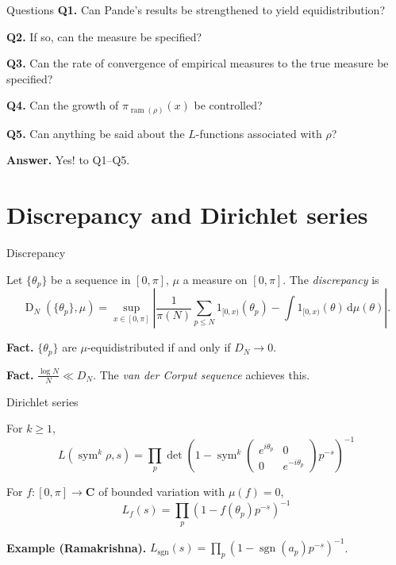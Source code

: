 \documentclass{beamer}
\DeclareMathOperator{\D}{D}
\DeclareMathOperator{\ram}{ram}
\DeclareMathOperator{\sgn}{sgn}
\DeclareMathOperator{\sym}{sym}
\newcommand{\bC}{\mathbf{C}}
\newcommand{\dd}{\mathrm{d}}
\begin{document}
\begin{frame}{Questions}
\textbf{Q1.} Can Pande's results be strengthened to yield equidistribution? 
\pause

\textbf{Q2.} If so, can the measure be specified?
\pause

\textbf{Q3.} Can the rate of convergence of empirical measures to the true measure 
be specified?
\pause

\textbf{Q4.} Can the growth of $\pi_{\ram(\rho)}(x)$ be controlled?
\pause

\textbf{Q5.} Can anything be said about the $L$-functions associated with $\rho$?
\pause

\textbf{Answer.} Yes! to Q1--Q5. 
\end{frame}





\section{Discrepancy and Dirichlet series}

\begin{frame}{Discrepancy}
\begin{definition}
Let $\{\theta_p\}$ be a sequence in $[0,\pi]$, $\mu$ a measure on $[0,\pi]$. 
The \emph{discrepancy} is 
\[
	\D_N(\{\theta_p\},\mu) =  \sup_{x\in [0,\pi]}\left| \frac{1}{\pi(N)} \sum_{p\leqslant N} 1_{[0,x)}(\theta_p) - \int 1_{[0,x)}(\theta) \, \dd\mu(\theta)\right| .
\]
\end{definition}
\pause

\textbf{Fact.}
$\{\theta_p\}$ are $\mu$-equidistributed if and only if $D_N \to 0$. 
\pause

\textbf{Fact.}
$\frac{\log N}{N} \ll D_N$. The \emph{van der Corput sequence} achieves this. 
\end{frame}



\begin{frame}{Dirichlet series}
\begin{definition}
For $k\geqslant 1$, 
\[
	L(\sym^k \rho,s) = \prod_p \det\left( 1 - \sym^k \left(\begin{smallmatrix} e^{i \theta_p} & 0\\ 0 & e^{-i \theta_p}\end{smallmatrix}\right) p^{-s}\right)^{-1}
\]
\end{definition}
\pause

\begin{definition}
For $f\colon [0,\pi] \to \bC$ of bounded variation with $\mu(f) = 0$,  
\[
	L_f(s) = \prod_p \left( 1 - f(\theta_p) p^{-s}\right)^{-1}
\]
\end{definition}
\pause

\textbf{Example (Ramakrishna).}
$L_{\sgn}(s) = \prod_p \left(1 - \sgn(a_p) p^{-s}\right)^{-1}$. 
\end{frame}
\end{document}
